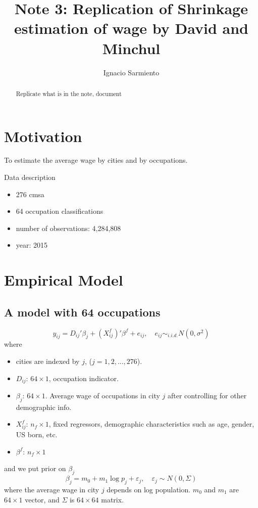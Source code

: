 \documentclass[11pt]{article}
\title{Note 3: Replication of Shrinkage estimation of wage by David and Minchul}
\author{Ignacio Sarmiento}
\newcommand{\ve}{\varepsilon}
\begin{document}
\maketitle

\begin{abstract}
Replicate what is in the note, document
\end{abstract}

\section{Motivation}
To estimate the average wage by cities and by occupations. 

Data description 
\begin{itemize}
\item 276 cmsa
\item 64 occupation classifications
\item number of observations: 4,284,808
\item year: 2015
\end{itemize}


\section{Empirical Model}

\subsection{A model with 64 occupations}
\[
y_{ij} = D_{ij}' \beta_{j} + (X_{ij}^{f})' \beta^{f} +e_{ij} , \quad e_{ij} \sim_{i.i.d.} N(0, \sigma^{2})
\]
where 
\begin{itemize}
\item cities are indexed by $j$, ($j=1,2,...,276$).
\item $D_{ij}$: $64 \times1$, occupation indicator. 

\item $\beta_{j}$: $64 \times 1$. Average wage of occupations in city $j$ after controlling for other demographic info. 
\item $X_{ij}^{f}$: $n_{f} \times 1$, fixed regressors, demographic characteristics such as age, gender, US born, etc.
\item $\beta^{f}$: $n_{f} \times 1$
\end{itemize}
and we put prior on $\beta_{j}$ 
\[
\beta_{j} = m_{0} + m_{1} \log p_{j} + \ve_{j}, \quad \ve_{j} \sim N(0, \Sigma)
\]
where the average wage in city $j$ depends on log population. $m_{0}$ and $m_{1}$ are $64\times 1$ vector, and $\Sigma$ is $64\times 64$ matrix.
\end{document}
